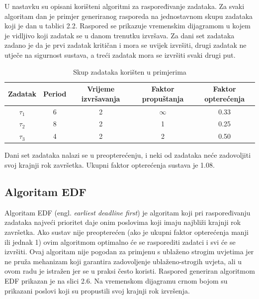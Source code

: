 \documentclass[../zavrsni.tex]{subfiles}
\begin{document}
U nastavku su opisani korišteni algoritmi za raspoređivanje zadataka.
Za svaki algoritam dan je primjer generiranog rasporeda na jednostavnom skupu zadataka koji je dan u tablici 2.2. 
Raspored se prikazuje vremenskim dijagramom u kojem
je vidljivo koji zadatak se u danom trenutku izvršava. 
Za dani set zadataka zadano je da je prvi
zadatak kritičan i mora se uvijek izvršiti, drugi zadatak ne utječe na sigurnost sustava, a treći zadatak mora se izvršiti svaki drugi put.

\begin{table}[h!]
    \begin{center}
      \begin{tabular}{||c || c | c | c | c||} 
       \hline
       Zadatak & Period & Vrijeme izvršavanja & Faktor propuštanja & Faktor opterećenja \\ [0.5ex] 
       \hline\hline
       $\tau_1$ & 6 & 2 & $\infty$ & 0.33 \\ 
       \hline
       $\tau_2$ & 8 & 2 & 1 & 0.25 \\
       \hline
       $\tau_3$ & 4 & 2 & 2 & 0.50 \\
       \hline
      \end{tabular}
    \end{center}
    \caption{\label{tab:table-name}Skup zadataka korišten u primjerima}
    \end{table}

Dani set zadataka nalazi se u preopterećenju, i neki od zadataka neće zadovoljiti svoj krajnji rok završetka. Ukupni faktor opterećenja
sustava je 1.08.

\subsection{Algoritam EDF}

Algoritam EDF (engl. \textit{earliest deadline first}) je algoritam koji pri raspoređivanju zadataka najveći prioritet daje onim poslovima 
koji imaju najbliži krajnji rok završetka. 
Ako sustav nije preopterećen (ako je ukupni faktor opterećenja manji ili jednak 1) 
ovim algoritmom optimalno će se rasporediti zadatci i svi će se izvršiti. Ovaj algoritam nije pogodan za primjenu s ublaženo strogim uvjetima 
jer ne pruža mehanizam koji garantira zadovoljenje ublaženo-strogih uvjeta,  
ali u ovom radu je istražen jer se u praksi često koristi. 
Raspored generiran algoritmom EDF prikazan je na slici 2.6.
Na vremenskom dijagramu crnom bojom su prikazani poslovi koji su propustili svoj krajnji rok izvršenja.
\end{document}
